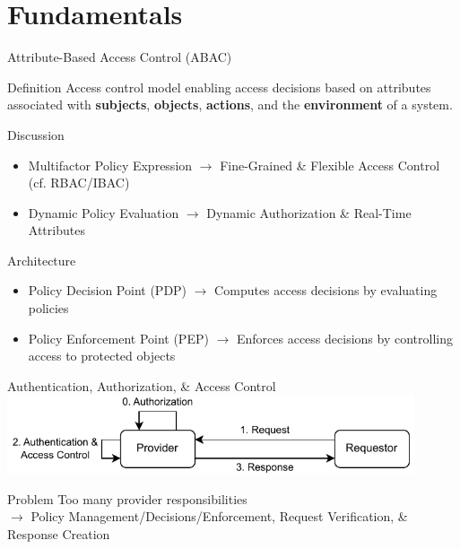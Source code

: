 \documentclass[en]{sdqbeamer}
\begin{document}
\section{Fundamentals}
\begin{frame}{Attribute-Based Access Control (ABAC)}
    \begin{greenblock}{Definition \parencite{JTF2020}}
        Access control model enabling access decisions based on attributes associated with \textbf{subjects}, \textbf{objects}, \textbf{actions}, and the \textbf{environment} of a system.
    \end{greenblock}
    \begin{blueblock}{Discussion \parencite{Hu2014}}
        \begin{itemize}
            \item Multifactor Policy Expression $\rightarrow$ Fine-Grained \& Flexible Access Control (cf. RBAC/IBAC)
            \item Dynamic Policy Evaluation $\rightarrow$ Dynamic Authorization \& Real-Time Attributes
        \end{itemize}
    \end{blueblock}
    \begin{grayblock}{Architecture \parencite{Hu2014,Oasis2013}}
        \begin{itemize}
            \item Policy Decision Point (PDP) $\rightarrow$ Computes access decisions by evaluating policies
            \item Policy Enforcement Point (PEP) $\rightarrow$ Enforces access decisions by controlling access to protected objects
        \end{itemize}
    \end{grayblock}
\end{frame}
\begin{frame}{Authentication, Authorization, \& Access Control}
    \centering
	\includegraphics[width=0.9\textwidth]{./figures/access_control_request_traditional.drawio.pdf}
    \begin{redblock}{Problem}
        Too many provider responsibilities
        \\$\rightarrow$ Policy Management/Decisions/Enforcement, Request Verification, \& Response Creation
    \end{redblock}
\end{frame}
\end{document}
